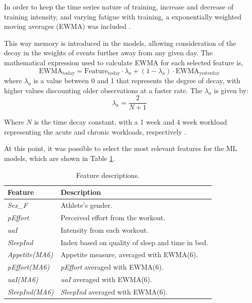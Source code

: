 \documentclass[conference]{IEEEtran}
\begin{document}
In order to keep the time series nature of training, increase and decrease of training intensity, and varying fatigue with training, a exponentially weighted moving averages (EWMA) was included \cite{Williams17}.

This way memory is introduced in the models, allowing consideration of the decay in the weights of events further away from any given day. The mathematical expression used to calculate EWMA for each selected feature is,
\begin{equation*}
    \text{EWMA}_{\text{today}} = \text{Feature}_{\text{today}} \cdot \lambda_a + (1 - \lambda_a) \cdot \text{EWMA}_{\text{yesterday}}
\end{equation*}
where $\lambda_a$ is a value between 0 and 1 that represents the degree of decay, with higher values discounting older observations at a faster rate. The $\lambda_a$ is given by:
\begin{equation*}
    \lambda_a = \frac{2}{N + 1}
\end{equation*} 

Where $N$ is the time decay constant, with a 1 week and 4 week workload representing the acute and chronic workloads, respectively \cite{Murray16}.

At this point, it was possible to select the most relevant features for the ML models, which are shown in Table \ref{features_selection}.

\begin{table}[H]
\centering
\caption{Feature descriptions.}
\label{features_selection}
\begin{tabular}{ll}
\toprule
\textbf{Feature} & \textbf{Description} \\
\midrule
\textit{Sex\_F} & Athlete's gender.  \\
\textit{pEffort} & Perceived effort from the workout. \\
\textit{uaI} & Intensity from each workout. \\
\textit{SleepInd} & Index based on quality of sleep and time in bed. \\
\textit{Appetite(MA6)} & Appetite measure, averaged with EWMA(6). \\
\textit{pEffort(MA6)} & \textit{pEffort} averaged with EWMA(6). \\
\textit{uaI(MA6)} & \textit{uaI} averaged with EWMA(6). \\
\textit{SleepInd(MA6)} & \textit{SleepInd} averaged with EWMA(6). \\
\bottomrule
\end{tabular}
\end{table}
\end{document}
